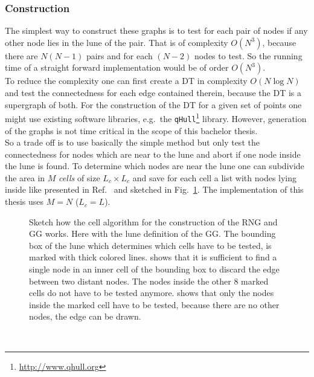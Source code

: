     \subsubsection{Construction}
        The simplest way to construct these graphs is to test for each
        pair of nodes if any other node lies in
        the lune of the pair. That is of complexity \(O (N^3)\), because
        there are \(N(N-1)\) pairs and for each \((N-2)\) nodes to test. So
        the running time of a straight forward implementation would be of
        order \(O(N^3)\).\\
        To reduce the complexity one can first create a DT in complexity \(O (N \log N)\)
        \cite{RNGCell} and test the connectedness for each edge contained
        therein, because the DT is a supergraph of both.
        For the construction of the DT for a given set of points one might
        use existing software libraries, e.g.\ the \texttt{qHull}\footnote{\url{http://www.qhull.org}} library.
        However, generation of the graphs is not time critical in the scope
        of this bachelor thesis.\\
        So a trade off is to use basically the simple method but only test
        the connectedness for nodes which are near to the lune and abort if
        one node inside the lune is found. To determine which nodes are
        near the lune one can subdivide the area in \(M\) \emph{cells} of size
        \(L_c \times L_c\) and save for each cell a list with nodes lying
        inside like presented in Ref.\ \cite{RNGCell} and sketched in Fig.\ \ref{fig:cell}.
        The implementation of this thesis uses \(M = N\) (\(L_c = L\)).
        \begin{figure}[htbp]
            \centering
            \caption[Sketch how the Cell Method works]
            {
                Sketch how the cell algorithm for the construction of the
                RNG and GG works. Here with the lune definition of the GG.
                The bounding box of the lune which determines which cells have
                to be tested, is marked with thick colored lines.
                 shows that it is sufficient to find a
                single node in an inner cell of the bounding box to discard
                the edge between two distant nodes. The nodes inside the
                other 8 marked cells do not have to be tested anymore.
                 shows that only the nodes inside the
                marked cell have to be tested, because there are no other nodes,
                the edge can be drawn.
            }
            \label{fig:cell}
        \end{figure}\\

